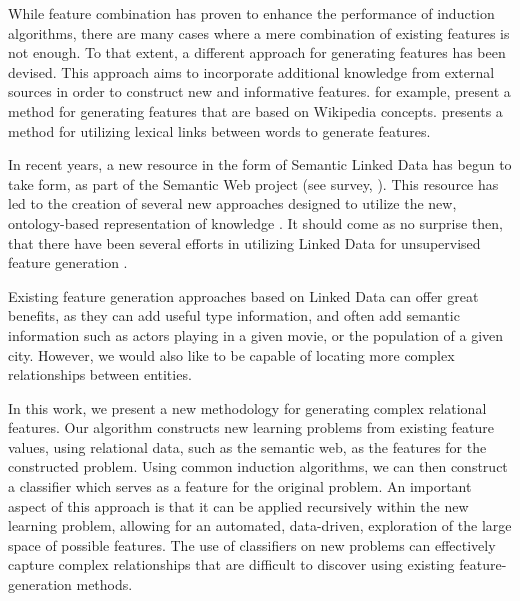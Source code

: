 \documentclass{article}
\theoremstyle{definition}
\begin{document}
While feature combination has proven to enhance the performance of induction algorithms, there are many cases where a mere combination of existing features is not enough.  To that extent, a different approach for generating features has been devised.  This approach aims to incorporate additional knowledge from external sources in order to construct new and informative features.
\citet{gabrilovich2009wikipedia} for example, present a method for generating features that are based on Wikipedia concepts. \citet{jarmasz2012roget} presents a method for utilizing lexical links between words to generate features.

In recent years, a new resource in the form of Semantic Linked Data has begun to take form, as part of the Semantic Web project (see survey, \citet{bizer2009linked}). This resource has led to the creation of several new approaches designed to utilize the new, ontology-based representation of knowledge \citep{losch2012graph,rios2014statistical}.
It should come as no surprise then, that there have been several efforts in utilizing Linked Data for unsupervised feature generation \citep{cheng2011automated, paulheim2012unsupervised}. 

Existing feature generation approaches based on Linked Data can offer great benefits, as they can add useful type information, and often add semantic information such as actors playing in a given movie, or the population of a given city.
However, we would also like to be capable of locating more complex relationships between entities.

In this work, we present a new methodology for generating complex relational features.  Our algorithm constructs new learning problems from existing feature values, using relational data, such as the semantic web, as the features for the constructed problem.
Using common induction algorithms, we can then construct a classifier which serves as a feature for the original problem. An important aspect of this approach is that it can be applied recursively within the new learning problem, allowing for an automated, data-driven, exploration of the large space of possible features.
The use of classifiers on new problems can effectively capture complex relationships that are difficult to discover using existing feature-generation methods.
\end{document}
